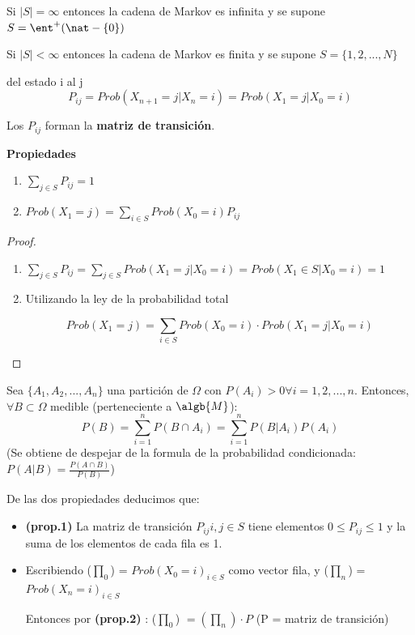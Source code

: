Si $|S| = \infty$ entonces la cadena de Markov es infinita y se supone $S = \ent^+ (\nat -\{0\})$


Si $|S| < \infty$ entonces la cadena de Markov es finita y se supone $S =\{1,2,...,N\}$

\begin{defn}
	del estado i al j
	$$P_{ij} = Prob(X_{n+1} = j| X_n = i) = Prob (X_1 = j| X_0 = i)$$
\end{defn}

Los $P_{ij}$ forman la \textbf{matriz de transición}.


\textbf{Propiedades}
\begin{enumerate}
	\item $\sum_{j \in S} P_{ij} = 1$
	\item $Prob(X_1 = j)= \sum_{i \in S} Prob(X_0 = i)P_{ij}$\\
\end{enumerate}

\begin{proof}
	\begin{enumerate}
		\item $\sum_{j \in S} P_{ij} = \sum_{j\in S} Prob(X_1 = j | X_0 = i) = Prob (X_1 \in S | X_0 = i) = 1$
		\item Utilizando la ley de la probabilidad total

		$$Prob(X_1 = j) = \sum_{i \in S} Prob (X_0 = i) \cdot Prob(X_1 = j| X_0 = i)$$
	\end{enumerate}
\end{proof}

	\begin{defn}
		Sea  $\{A_1, A_2,...,A_n\}$ una partición de $\Omega$ con $P(A_i)>0 \forall i=1,2,...,n$. Entonces, $\forall B \subset \Omega$ medible (perteneciente a $\algb{M}$):
		\[
		P(B)=\sum_{i=1}^{n}P(B\cap A_i)=\sum_{i=1}^{n}P(B|A_i)P(A_i)
		\]
		(Se obtiene de despejar de la formula de la probabilidad condicionada: $P(A|B)=\frac{P(A \cap B)}{P(B)}$)
	\end{defn}


De las dos propiedades deducimos que:
\begin{itemize}
	\item \textbf{(prop.1)} La matriz de transición $P_{ij} i,j \in S$ tiene elementos $0 \leq P_{ij} \leq 1$ y la suma de los elementos de cada fila es 1.
	\item Escribiendo ($\prod_0$) = ${Prob (X_0 =i)}_{i \in S}$ como vector fila, y ($\prod_n$) = ${Prob (X_n =i)}_{i \in S}$

	Entonces por \textbf{(prop.2)} : ($\prod_0$) $ = (\prod_n)\cdot P$ (P = matriz de transición)
\end{itemize}

